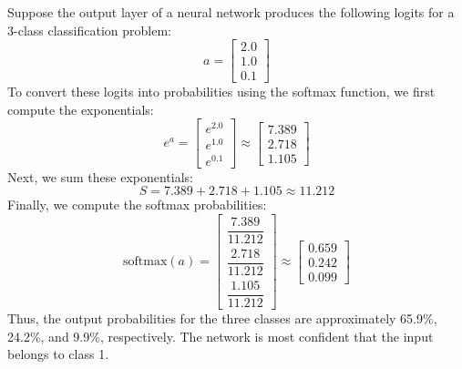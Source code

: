 \begin{examplebox}
    Suppose the output layer of a neural network produces the following logits for a 3-class classification problem:
    \begin{equation*}
        a = \begin{bmatrix}
            2.0 \\
            1.0 \\
            0.1
        \end{bmatrix}
    \end{equation*}
    To convert these logits into probabilities using the softmax function, we first compute the exponentials:
    \begin{equation*}
        e^{a} = \begin{bmatrix}
            e^{2.0} \\
            e^{1.0} \\
            e^{0.1}
        \end{bmatrix} \approx \begin{bmatrix}
            7.389 \\
            2.718 \\
            1.105
        \end{bmatrix}
    \end{equation*}
    Next, we sum these exponentials:
    \begin{equation*}
        S = 7.389 + 2.718 + 1.105 \approx 11.212
    \end{equation*}
    Finally, we compute the softmax probabilities:
    \begin{equation*}
        \text{softmax}(a) = \begin{bmatrix}
            \dfrac{7.389}{11.212} \\[1.2em]
            \dfrac{2.718}{11.212} \\[1.2em]
            \dfrac{1.105}{11.212}
        \end{bmatrix} \approx \begin{bmatrix}
            0.659 \\
            0.242 \\
            0.099
        \end{bmatrix}
    \end{equation*}
    Thus, the output probabilities for the three classes are approximately 65.9\%, 24.2\%, and 9.9\%, respectively. The network is most confident that the input belongs to class 1.
\end{examplebox}

